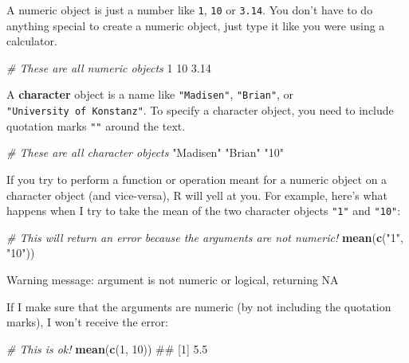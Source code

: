 \documentclass[]{book}
\newenvironment{Shaded}{\begin{snugshade}}{\end{snugshade}}
\newcommand{\KeywordTok}[1]{\textcolor[rgb]{0.13,0.29,0.53}{\textbf{{#1}}}}
\newcommand{\DecValTok}[1]{\textcolor[rgb]{0.00,0.00,0.81}{{#1}}}
\newcommand{\FloatTok}[1]{\textcolor[rgb]{0.00,0.00,0.81}{{#1}}}
\newcommand{\StringTok}[1]{\textcolor[rgb]{0.31,0.60,0.02}{{#1}}}
\newcommand{\CommentTok}[1]{\textcolor[rgb]{0.56,0.35,0.01}{\textit{{#1}}}}
\newcommand{\NormalTok}[1]{{#1}}
\theoremstyle{definition}
\theoremstyle{definition}
\theoremstyle{remark}
\begin{document}
A numeric object is just a number like \texttt{1}, \texttt{10} or
\texttt{3.14}. You don't have to do anything special to create a numeric
object, just type it like you were using a calculator.

\begin{Shaded}
\begin{Highlighting}[]
\CommentTok{# These are all numeric objects}
\DecValTok{1}
\DecValTok{10}
\FloatTok{3.14}
\end{Highlighting}
\end{Shaded}

A \textbf{character} object is a name like \texttt{"Madisen"},
\texttt{"Brian"}, or \texttt{"University\ of\ Konstanz"}. To specify a
character object, you need to include quotation marks \texttt{""} around
the text.

\begin{Shaded}
\begin{Highlighting}[]
\CommentTok{# These are all character objects}
\StringTok{"Madisen"}
\StringTok{"Brian"}
\StringTok{"10"}
\end{Highlighting}
\end{Shaded}

If you try to perform a function or operation meant for a numeric object
on a character object (and vice-versa), R will yell at you. For example,
here's what happens when I try to take the mean of the two character
objects \texttt{"1"} and \texttt{"10"}:

\begin{Shaded}
\begin{Highlighting}[]
\CommentTok{# This will return an error because the arguments are not numeric!}
\KeywordTok{mean}\NormalTok{(}\KeywordTok{c}\NormalTok{(}\StringTok{"1"}\NormalTok{, }\StringTok{"10"}\NormalTok{))}
\end{Highlighting}
\end{Shaded}

Warning message: argument is not numeric or logical, returning NA

If I make sure that the arguments are numeric (by not including the
quotation marks), I won't receive the error:

\begin{Shaded}
\begin{Highlighting}[]
\CommentTok{# This is ok!}
\KeywordTok{mean}\NormalTok{(}\KeywordTok{c}\NormalTok{(}\DecValTok{1}\NormalTok{, }\DecValTok{10}\NormalTok{))}
\NormalTok{## [1] 5.5}
\end{Highlighting}
\end{Shaded}
\end{document}
